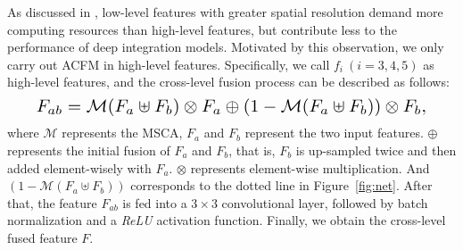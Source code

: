 \documentclass{article}
\begin{document}
As discussed in \cite{cpd}, low-level features with greater spatial resolution demand more computing resources than high-level features, but contribute less to the performance of deep integration models. Motivated by this observation, we only carry out ACFM in high-level features. Specifically, we call ${f_{i}~(i=3, 4, 5)}$ as high-level features, and the cross-level fusion process can be described as follows:
\begin{equation}
\resizebox{.91\linewidth}{!}{$
    \displaystyle
    F_{ab}=\mathcal{M}(F_{a}\uplus F_{b})\otimes F_{a}\oplus(1-\mathcal{M}(F_{a}\uplus F_{b}))\otimes F_{b},
$}
\end{equation}%
where $\mathcal{M}$ represents the MSCA, $F_{a}$ and $F_{b}$ represent the two input features. $\oplus$ represents the initial fusion of $F_{a}$ and $F_{b}$, that is, $F_{b}$ is up-sampled twice and then added element-wisely with $F_{a}$. $\otimes$ represents element-wise multiplication. And $(1-\mathcal{M}(F_{a}\uplus F_{b}))$ corresponds to the dotted line in Figure~\ref{fig:net}. After that, the feature $F_{ab}$ is fed into a $3\times{3}$ convolutional layer, followed by batch normalization and a \emph{ReLU} activation function. Finally, we obtain the cross-level fused feature $F$.




\end{document}
